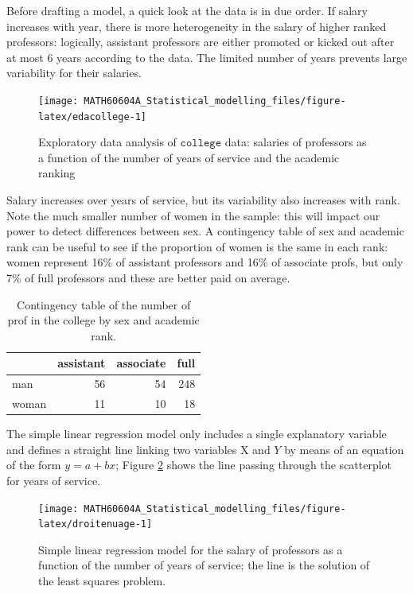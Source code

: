 \documentclass[
  11pt,
  letterpaper,
]{book}
\theoremstyle{definition}
\theoremstyle{definition}
\theoremstyle{definition}
\theoremstyle{definition}
\theoremstyle{remark}
\begin{document}
Before drafting a model, a quick look at the data is in due order. If salary increases with year, there is more heterogeneity in the salary of higher ranked professors: logically, assistant professors are either promoted or kicked out after at most 6 years according to the data. The limited number of years prevents large variability for their salaries.

\begin{figure}

{\centering \texttt{[image: MATH60604A\_Statistical\_modelling\_files/figure-latex/edacollege-1]} 

}

\caption{Exploratory data analysis of $\texttt{college}$ data: salaries of professors as a function of the number of years of service and the academic ranking}\label{fig:edacollege}
\end{figure}

Salary increases over years of service, but its variability also increases with rank. Note the much smaller number of women in the sample: this will impact our power to detect differences between sex. A contingency table of sex and academic rank can be useful to see if the proportion of women is the same in each rank: women represent 16\% of assistant professors and 16\% of associate profs, but only 7\% of full professors and these are better paid on average.

\begin{table}

\caption{\label{tab:tableaucontingence}Contingency table of the number of prof in the college by sex and academic rank.}
\centering
\begin{tabular}[t]{lrrr}
\toprule
  & assistant & associate & full\\
\midrule
man & 56 & 54 & 248\\
woman & 11 & 10 & 18\\
\bottomrule
\end{tabular}
\end{table}

The simple linear regression model only includes a single explanatory variable and defines a straight line linking two variables \(\mathrm{X}\) and \(Y\) by means of an equation of the form \(y=a+bx\); Figure \ref{fig:droitenuage} shows the line passing through the scatterplot for years of service.

\begin{figure}

{\centering \texttt{[image: MATH60604A\_Statistical\_modelling\_files/figure-latex/droitenuage-1]} 

}

\caption{Simple linear regression model for the salary of professors as a function of the number of years of service; the line is the solution of the least squares problem.}\label{fig:droitenuage}
\end{figure}
\end{document}
